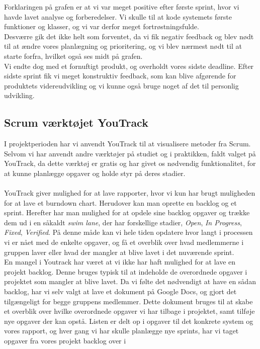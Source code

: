 Forklaringen på grafen er at vi var meget positive efter første sprint, hvor vi havde lavet analyse og forberedelser.
Vi skulle til at kode systemets første funktioner og klasser, og vi var derfor meget fortrøstningsfulde.
\\
Desværre gik det ikke helt som forventet, da vi fik negativ feedback og blev nødt til at ændre vores planlægning og prioritering,
og vi blev nærmest nødt til at starte forfra, hvilket også ses midt på grafen.
\\
Vi endte dog med et fornuftigt produkt, og overholdt vores sidste deadline. Efter sidste sprint fik vi meget konstruktiv feedback, 
som kan blive afgørende for produktets videreudvikling og vi kunne også bruge noget af det til personlig udvikling.

\subsection{Scrum værktøjet YouTrack}
I projektperioden har vi anvendt YouTrack til at visualisere metoder fra Scrum.
\\
Selvom vi har anvendt andre værktøjer på studiet og i praktikken, faldt valget på YouTrack, da dette værktøj er gratis og
har givet os nødvendig funktionalitet, for at kunne planlægge opgaver og holde styr på deres stadier.
\\\\
YouTrack giver mulighed for at lave rapporter, hvor vi kun har brugt muligheden for at lave et burndown chart. Herudover kan man oprette
en backlog og et sprint. Herefter har man mulighed for at opdele sine backlog opgaver og trække dem ud i en såkaldt \textit{swim lane}, der har forskellige
stadier, \textit{Open}, \textit{In Progress}, \textit{Fixed}, \textit{Verified}. På denne måde kan vi hele tiden opdatere hvor langt i processen vi er nået
med de enkelte opgaver, og få et overblik over hvad medlemmerne i gruppen laver eller hvad der mangler at blive lavet i det nuværende sprint.
\\
En mangel i Youtrack har været at vi ikke har haft mulighed for at lave en projekt backlog. Denne bruges typisk til at indeholde de overordnede opgaver i
projektet som mangler at blive lavet. Da vi følte det nødvendigt at have en sådan backlog, har vi selv valgt at lave et dokument på Google Docs, og gjort det tilgængeligt
for begge gruppens medlemmer. Dette dokument bruges til at skabe et overblik over hvilke overordnede opgaver vi har tilbage i projektet, samt tilføje nye opgaver der kan opstå.
Listen er delt op i opgaver til det konkrete system og vores rapport, og hver gang vi har skulle planlægge nye sprints, har vi taget opgaver fra vores projekt backlog over i
